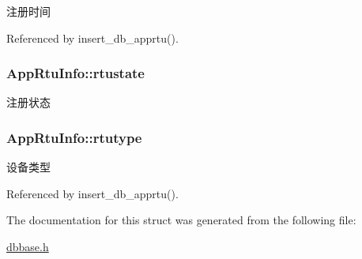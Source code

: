 注册时间 



Referenced by insert\-\_\-db\-\_\-apprtu().

\hypertarget{structAppRtuInfo_a4b7f6869eb4bdbe622f2cc6050d31e1f}{
\subsubsection[{rtustate}]{ App\-Rtu\-Info\-::rtustate}}\label{structAppRtuInfo_a4b7f6869eb4bdbe622f2cc6050d31e1f}


注册状态 

\hypertarget{structAppRtuInfo_ac1276ea402781dd4b37db5a8e42cc4ed}{
\subsubsection[{rtutype}]{ App\-Rtu\-Info\-::rtutype}}\label{structAppRtuInfo_ac1276ea402781dd4b37db5a8e42cc4ed}


设备类型 



Referenced by insert\-\_\-db\-\_\-apprtu().



The documentation for this struct was generated from the following file\-:\begin{DoxyCompactItemize}
\item 
\hyperlink{dbbase_8h}{dbbase.\-h}\end{DoxyCompactItemize}
